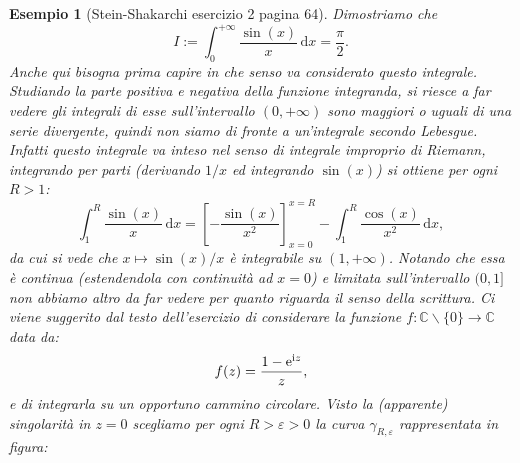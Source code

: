 \documentclass[11pt]{book}
\theoremstyle{Definizione}
\theoremstyle{TeoremaProposizioneLemmaCorollarioCongettura}
\theoremstyle{OsservazioneNotaEsempio}
\newtheorem{myes}{Esempio}[section]
\newcommand{\R}{\mathbb{R}}
\newcommand{\C}{\mathbb{C}}
\newcommand{\tolto}{\smallsetminus}
\renewcommand{\i}{\textup{i}}
\newcommand{\e}{\textup{e}}
\renewcommand{\d}{\mathrm{d}}
\newcommand{\dx}{\,\d x}
\newcommand{\frecciaIn}{
\tikz \draw[-latex] (-1pt,0) -- (1pt,0);
}
\newcommand{\frecciaOut}{
\tikz \draw[latex-] (-1pt,0) -- (1pt,0);
}
\begin{document}
\begin{myes}[Stein-Shakarchi esercizio 2 pagina 64]\label{es:SteinShakarchiEs2pag64}
Dimostriamo che
$$
I:=\int_0^{+\infty} \frac{\sin(x)}{x}\dx = \frac{\pi}{2}.
$$
Anche qui bisogna prima capire in che senso va considerato questo integrale. Studiando la parte positiva e negativa della funzione integranda, si riesce a far vedere gli integrali di esse sull'intervallo $(0,+\infty)$ sono maggiori o uguali di una serie divergente, quindi non siamo di fronte a un'integrale secondo Lebesgue. Infatti questo integrale va inteso nel senso di integrale improprio di Riemann, integrando per parti (derivando $1/x$ ed integrando $\sin(x)$) si ottiene per ogni $R > 1$:
$$
\int_1^R \frac{\sin(x)}{x}\dx = \left[-\frac{\sin(x)}{x^2}\right]_{x = 0}^{x = R} -\int_1^{R} \frac{\cos(x)}{x^2}\dx,
$$
da cui si vede che $x \longmapsto \sin(x)/x$ è integrabile su $(1,+\infty)$. Notando che essa è continua (estendendola con continuità ad $x = 0$) e limitata sull'intervallo $(0,1]$ non abbiamo altro da far vedere per quanto riguarda il senso della scrittura. Ci viene suggerito dal testo dell'esercizio di considerare la funzione $f:\C\tolto \{0\} \longrightarrow \C$ data da:
$$
f(z) = \frac{1-\e^{\i z}}{z},
$$
e di integrarla su un opportuno cammino circolare. Visto la (apparente) singolarità in $z = 0$ scegliamo per ogni $R > \varepsilon > 0$ la curva $\gamma_{R,\varepsilon}$ rappresentata in figura:
\begin{center}
\end{center}
\end{myes}
\end{document}
